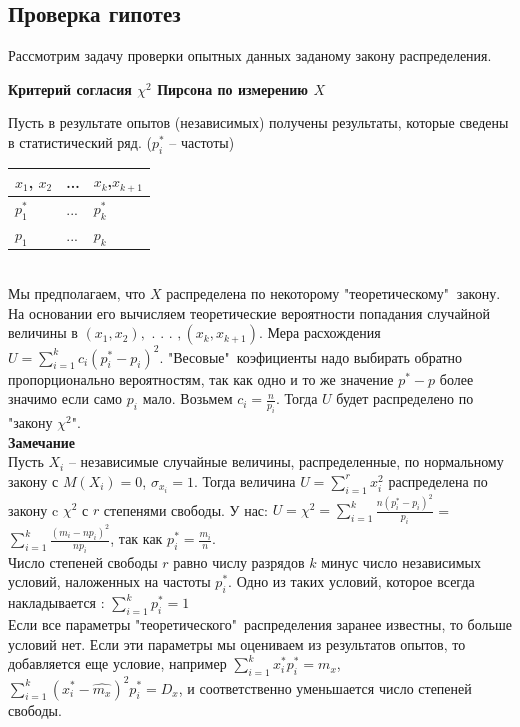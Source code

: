 \documentclass[russian, 12pt, fleqn,x11names]{article}
\begin{document}
\subsection{Проверка гипотез}
Рассмотрим задачу проверки опытных данных заданому закону распределения.
\begin{center}\textbf{Критерий согласия $\chi^2$ Пирсона по измерению $X$}\end{center}
Пусть в результате опытов (независимых) получены результаты, которые сведены в статистический ряд. ($p_i^*$ -- частоты)\\
\begin{tabular}[b]{ | l |  l | l |    }
\hline
$x_1$, $x_2$ &... &$ x_k$,$x_{k+1}$\\
\hline
$p^*_1$&...&$p^*_k$\\
\hline
$p_1$& ... &$p_k$\\
\hline
\end{tabular}\\
Мы предполагаем, что $X$ распределена по некоторому "теоретическому"$\ $ закону. На основании его вычисляем теоретические вероятности попадания случайной величины в $(x_1,x_2),$ . . . $,(x_k, x_{k+1})$. Мера расхождения $U = \displaystyle{\sum \limits_{i = 1} ^ {k}} c_i(p_i^* - p_i)^2$. 
"Весовые"\  коэфициенты надо выбирать обратно пропорционально  вероятностям, так как одно и то же значение $p^*-p$ более значимо  если само $p_i$ мало. Возьмем $c_i=\frac{n}{p_i}$. Тогда $U$ будет распределено по "закону $\chi^2$".\\
\textbf{Замечание\ } \\
Пусть $X_i$ -- независимые случайные величины, распределенные, по нормальному закону с $M(X_i) = 0$, $\sigma_{x_i} = 1$. Тогда величина $U = \displaystyle{\sum \limits_{i  = 1}^{r}} x_i^2$ распределена по закону c $\chi^2$ с $r$ степенями свободы. У нас: $U = \chi^2 = \displaystyle{\sum \limits_{i = 1}^{k}} \frac{n(p_i^* - p_i)^2}{p_i}$ = $\displaystyle{\sum \limits_{i = 1}^{k}} \frac{(m_i - np_i)^2}{n p_i}$,  так как $p_i^* = \frac{m_i}{n}$.\\
Число степеней свободы $r$ равно числу разрядов $k$ минус число независимых условий, наложенных на частоты $p_i^*$. Одно из таких условий, которое всегда накладывается : $\displaystyle{\sum \limits _{i = 1} ^ {k}} p_i^* = 1$\\
Если все параметры "теоретического"\ распределения заранее известны, то больше условий нет. Если эти параметры мы оцениваем из результатов опытов, то добавляется еще условие, например $\displaystyle{\sum \limits_{i = 1} ^ {k}} x_i^* p_i^* = m_x$, $\displaystyle{\sum \limits_{i = 1} ^ {k}}( x_i^* - \hat{m_x} )^2 p_i^* = D_x$, и соответственно уменьшается число степеней свободы.\\
\end{document}
